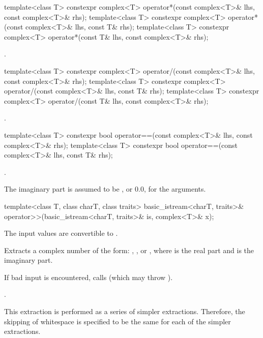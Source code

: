 %
\begin{itemdecl}
template<class T> constexpr complex<T> operator*(const complex<T>& lhs, const complex<T>& rhs);
template<class T> constexpr complex<T> operator*(const complex<T>& lhs, const T& rhs);
template<class T> constexpr complex<T> operator*(const T& lhs, const complex<T>& rhs);
\end{itemdecl}

\begin{itemdescr}
\pnum
\returns
{}.
\end{itemdescr}

%
\begin{itemdecl}
template<class T> constexpr complex<T> operator/(const complex<T>& lhs, const complex<T>& rhs);
template<class T> constexpr complex<T> operator/(const complex<T>& lhs, const T& rhs);
template<class T> constexpr complex<T> operator/(const T& lhs, const complex<T>& rhs);
\end{itemdecl}

\begin{itemdescr}
\pnum
\returns
{}.
\end{itemdescr}

%
\begin{itemdecl}
template<class T> constexpr bool operator==(const complex<T>& lhs, const complex<T>& rhs);
template<class T> constexpr bool operator==(const complex<T>& lhs, const T& rhs);
\end{itemdecl}

\begin{itemdescr}
\pnum
\returns
{}.

\pnum
\remarks
The imaginary part is assumed to be
,
or 0.0, for the
arguments.
\end{itemdescr}

%
\begin{itemdecl}
template<class T, class charT, class traits>
  basic_istream<charT, traits>& operator>>(basic_istream<charT, traits>& is, complex<T>& x);
\end{itemdecl}

\begin{itemdescr}
\pnum
\expects
The input values are convertible to
.

\pnum
\effects
Extracts a complex number  of the form:
,
,
or
,
where
is the real part and
is the imaginary part.

\pnum
If bad input is encountered, calls
(which may throw
).

\pnum
\returns
{}.

\pnum
\remarks
This extraction is performed as a series of simpler
extractions.
Therefore, the skipping of whitespace is specified to be
the same for each of the simpler extractions.
\end{itemdescr}

